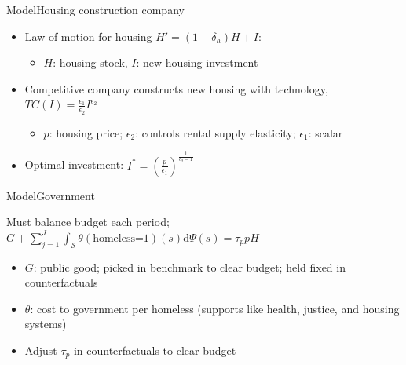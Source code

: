 \documentclass[11pt,aspectratio=169]{beamer}
\begin{document}
\begin{frame}{Model}{Housing construction company}

\begin{itemize}
    \item Law of motion for housing $H'=(1-\delta_{h})H+I$:
    \begin{itemize}
        \item $H$: housing stock, $I$: new housing investment
    \end{itemize}
    \item Competitive company constructs new housing with technology, $TC(I)=\frac{\epsilon_{1}}{\epsilon_{2}}I^{\epsilon_{2}}$
    \begin{itemize}
        \item $p$: housing price; $\epsilon_{2}$: controls rental supply elasticity; $\epsilon_{1}$: scalar
    \end{itemize}
    \item Optimal investment: $I^{*}=\left(\frac{p}{\epsilon_{1}}\right)^{\frac{1}{\epsilon_{2}-1}}$
\end{itemize}

\end{frame}

\begin{frame}{Model}{Government}

Must balance budget each period; $G + \sum_{j=1}^J \int_\mathcal{S} \theta (\mbox{homeless=1})(s)\mathrm{d}\Psi(s)= \tau_p p H$
\begin{itemize}
    \item $G$: public good; picked in benchmark to clear budget; held fixed in counterfactuals
    \item $\theta$: cost to government per homeless (supports like health, justice, and housing systems)  
    \item Adjust $\tau_p$ in counterfactuals to clear budget
\end{itemize}

\end{frame}
\end{document}
